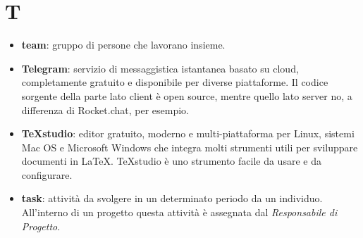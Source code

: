 \section{T}
\begin{itemize}
	\item \textbf{team}: gruppo di persone che lavorano insieme.
	\item \textbf{Telegram}: servizio di messaggistica istantanea basato su cloud, completamente gratuito e disponibile per diverse piattaforme. Il codice sorgente della parte lato client è open source, mentre quello lato server no, a differenza di Rocket.chat, per esempio.
	\item \textbf{TeXstudio}: editor gratuito, moderno e multi-piattaforma per Linux, sistemi Mac OS e Microsoft Windows che integra molti strumenti utili per sviluppare documenti in \LaTeX. TeXstudio è uno strumento facile da usare e da configurare.
	\item \textbf{task}: attività da svolgere in un determinato periodo da un individuo. All'interno di un progetto questa attività è assegnata dal \textit{Responsabile di Progetto}.
\end{itemize}

